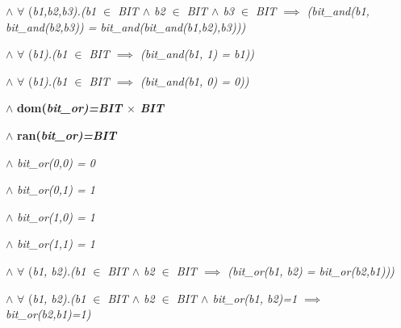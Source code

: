 \hspace*{0.20in}

\hspace*{0.20in} $\land$   $\forall$ \rm (\it b1\rm ,\it b2\rm ,\it b3\rm )\rm .\rm (\it b1  $\in$  \it BIT  $\land$  \it b2  $\in$  \it BIT  $\land$  \it b3  $\in$  \it BIT  $\implies$  \rm (\it bit\_and\rm (\it b1\rm , \it bit\_and\rm (\it b2\rm ,\it b3\rm )\rm ) \rm = \it bit\_and\rm (\it bit\_and\rm (\it b1\rm ,\it b2\rm )\rm ,\it b3\rm )\rm )\rm )

\hspace*{0.20in} $\land$   $\forall$ \rm (\it b1\rm )\rm .\rm (\it b1  $\in$  \it BIT  $\implies$  \rm (\it bit\_and\rm (\it b1\rm , \rm 1\rm ) \rm = \it b1\rm )\rm )

\hspace*{0.20in} $\land$   $\forall$ \rm (\it b1\rm )\rm .\rm (\it b1  $\in$  \it BIT  $\implies$  \rm (\it bit\_and\rm (\it b1\rm , \rm 0\rm ) \rm = \rm 0\rm )\rm )

\vspace*{4mm}
\hspace*{0.20in} $\land$  \bf dom\rm (\it bit\_or\rm )\rm =\it BIT $\times$ \it BIT

\hspace*{0.20in} $\land$  \bf ran\rm (\it bit\_or\rm )\rm =\it BIT 

\hspace*{0.20in} $\land$  \it bit\_or\rm (\rm 0\rm ,\rm 0\rm ) \rm = \rm 0

\hspace*{0.20in} $\land$  \it bit\_or\rm (\rm 0\rm ,\rm 1\rm ) \rm = \rm 1

\hspace*{0.20in} $\land$  \it bit\_or\rm (\rm 1\rm ,\rm 0\rm ) \rm = \rm 1

\hspace*{0.20in} $\land$  \it bit\_or\rm (\rm 1\rm ,\rm 1\rm ) \rm = \rm 1

\hspace*{0.20in} $\land$   $\forall$ \rm (\it b1\rm , \it b2\rm )\rm .\rm (\it b1  $\in$  \it BIT  $\land$  \it b2  $\in$  \it BIT  $\implies$  \rm (\it bit\_or\rm (\it b1\rm , \it b2\rm ) \rm = \it bit\_or\rm (\it b2\rm ,\it b1\rm )\rm )\rm )

\hspace*{0.20in} $\land$   $\forall$ \rm (\it b1\rm , \it b2\rm )\rm .\rm (\it b1  $\in$  \it BIT  $\land$  \it b2  $\in$  \it BIT  $\land$  \it bit\_or\rm (\it b1\rm , \it b2\rm )\rm =\rm 1  $\implies$  \it bit\_or\rm (\it b2\rm ,\it b1\rm )\rm =\rm 1\rm ) 

